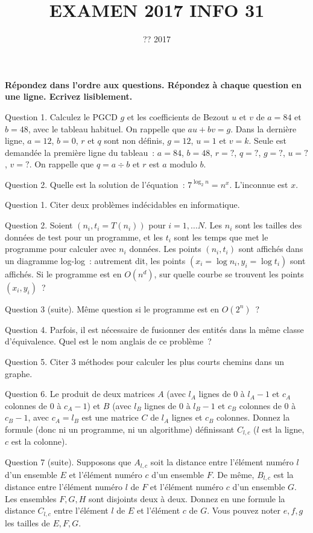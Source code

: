 \documentclass[a4paper]{article}
\begin{document}
\title{EXAMEN 2017 INFO 31}
\date{?? 2017}
\maketitle
{\bf Répondez dans l'ordre aux questions. Répondez à chaque question en une ligne. Ecrivez lisiblement.}

Question 1. Calculez le PGCD $g$ et les coefficients de Bezout $u$ et $v$ de $a=84$ et $b=48$, avec le tableau habituel.
On rappelle que $au+bv=g$.
Dans la dernière ligne, $a=12$, $b=0$, $r$ et $q$ sont non définis, $g=12$, $u=1$ et $v=k$.
Seule est demandée la première ligne du tableau~:
$a=84$, $b=48$, $r=?$, $q=?$, $g=?$,  $u=?$, $v=?$. On rappelle que $q=a \div b$ et $r$ est $a$ modulo $b$.

Question 2. Quelle est la solution de l'équation~: $7^{\log_2 n}=n^x$. L'inconnue est $x$.

Question 1. Citer deux problèmes indécidables en informatique.


Question 2. Soient $(n_i, t_i=T(n_i))$ pour $i=1, \ldots N$. Les $n_i$ sont les
tailles des données de test pour un programme, et les $t_i$ sont les temps que met le programme pour calculer avec $n_i$ données.  Les points $(n_i, t_i)$ 
sont affichés dans un diagramme log-log~: autrement dit, les points
$(x_i=\log n_i, y_i=\log t_i)$ sont affichés.
Si le programme est en $O(n^d)$, sur quelle courbe se trouvent
les points $(x_i, y_i)$~?

Question 3 (suite). Même question si le programme est en $O(2^n)$~?

Question 4. Parfois, il est nécessaire de fusionner des entités dans la même classe d'équivalence. Quel est le nom anglais de ce problème~?

Question 5. Citer 3 méthodes pour calculer les plus courts chemins dans un graphe.

Question 6. Le produit de deux matrices $A$ (avec $l_A$ lignes de 0 à $l_A-1$ et
$c_A$ colonnes de 0 à $c_A-1$) et $B$ (avec $l_B$ lignes de 0 à $l_B-1$ et $c_B$ colonnes de 0 à $c_B-1$, avec $c_A=l_B$ est une matrice
$C$ de $l_A$ lignes et $c_B$ colonnes. Donnez la formule (donc ni un programme, ni un algorithme) définissant $C_{l, c}$ ($l$ est la ligne, $c$ est la colonne). 

Question 7 (suite).
Supposons que $A_{l, c}$ soit la distance entre l'élément numéro $l$ d'un ensemble  $E$ et
l'élément numéro $c$ d'un ensemble $F$. De même, $B_{l, c}$ est la distance entre l'élément numéro $l$ de $F$ et  l'élément numéro $c$ d'un ensemble $G$. 
Les ensembles $F, G, H$ sont disjoints deux à deux. Donnez en une formule la distance $C_{l, c}$ entre l'élément $l$ de $E$ et l'élément $c$ de $G$.
Vous pouvez noter $e, f, g$
les tailles de $E, F, G$.
\end{document}
